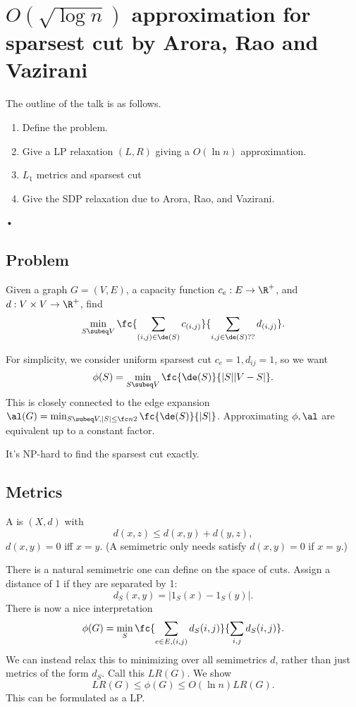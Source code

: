 
\section{$O(\sqrt{\log n})$ approximation for sparsest cut by Arora, Rao and Vazirani}

The outline of the talk is as follows.
\begin{enumerate}
\item
Define the problem.
\item
Give a LP relaxation $(L,R)$ giving a $O(\ln n)$ approximation.
\item
$L_1$ metrics and sparsest cut
\item 
Give the SDP relaxation due to Arora, Rao, and Vazirani. 
\end{enumerate}•

\subsection{Problem}

\begin{df}
Given a graph $G=(V,E)$, a capacity function $c_e:E\to \R^+$, and $d:V\times V\to \R^+$, find
\[
\min_{S\subeq V} \fc{\sum_{(i,j)\in \de(S)} c_{(i,j)}}{\sum_{i,j\in \de(S)??} d_{(i,j)}}.
\]
\end{df}
For simplicity, we consider uniform sparsest cut $c_e=1,d_{ij}=1$, so we want
\[
\phi(S)=\min_{S\subeq V} \fc{\de(S)}{|S||V-S|}.
\]
This is closely connected to the edge expansion $\al(G)=\min_{S\subeq V,|S|\le \fc n2} \fc{\de(S)}{|S|}$. Approximating $\phi,\al$ are equivalent up to a constant factor.

It's NP-hard to find the sparsest cut exactly. %
\subsection{Metrics}
\begin{df}
A  is $(X,d)$ with
\[
d(x,z)\le d(x,y)+d(y,z),
\]
$d(x,y)=0$ iff $x=y$. (A semimetric only needs satisfy $d(x,y)=0$ if $x=y$.)
\end{df}

There is a natural semimetric one can define on the space of cuts. Assign a distance of 1 if they are separated by 1:
\[
d_S(x,y)=|1_S(x)-1_S(y)|.
\]
There is now a nice interpretation
\[
\phi(G)=\min_S\fc{\sum_{e\in E,(i,j)}d_S(i,j)}{\sum_{i,j}d_S(i,j)}.
\]
We can instead relax this to minimizing over all semimetrics $d$, rather than just metrics of the form $d_S$.
Call this $LR(G)$. 
We show
\[
LR(G)\le \phi(G)\le O(\ln n)LR(G).
\]
This can be formulated as a LP.

